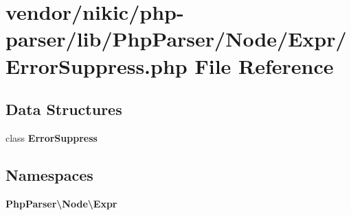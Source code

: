 \section{vendor/nikic/php-\/parser/lib/\+Php\+Parser/\+Node/\+Expr/\+Error\+Suppress.php File Reference}
\label{_error_suppress_8php}
\subsection*{Data Structures}
\begin{DoxyCompactItemize}
\item 
class {\bf Error\+Suppress}
\end{DoxyCompactItemize}
\subsection*{Namespaces}
\begin{DoxyCompactItemize}
\item 
 {\bf Php\+Parser\textbackslash{}\+Node\textbackslash{}\+Expr}
\end{DoxyCompactItemize}
